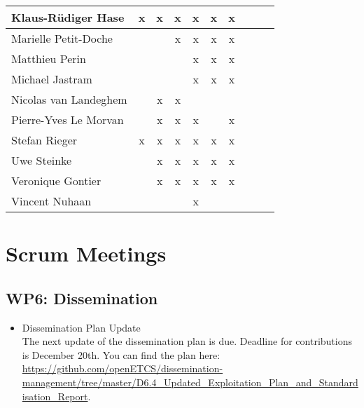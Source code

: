 \documentclass[a4paper, 11pt]{article}
\begin{document}
\begin{tabular}{|l|c|c|c||c|c|c||c|c|c|}
Klaus-R\"udiger Hase & x & x & x & x & x & x \\\hline
Marielle Petit-Doche &   &   & x & x & x & x \\\hline
Matthieu Perin       &   &   &   & x & x & x \\\hline
Michael Jastram      &   &   &   & x & x & x \\\hline
Nicolas van Landeghem&   & x & x &   &   &   \\\hline
Pierre-Yves Le Morvan&   & x & x & x &   & x \\\hline
Stefan Rieger        & x & x & x & x & x & x \\\hline
Uwe Steinke          &   & x & x & x & x & x \\\hline
Veronique Gontier    &   & x & x & x & x & x \\\hline
Vincent Nuhaan       &   &   &   & x &   &   \\\hline
\end{tabular}


\section{Scrum Meetings}

\subsection{WP6: Dissemination}
\begin{itemize}
\item Dissemination Plan Update\\
The next update of the dissemination plan is due. Deadline for contributions is December 20th. You can find the plan here:
\url{https://github.com/openETCS/dissemination-management/tree/master/D6.4_Updated_Exploitation_Plan_and_Standardisation_Report}.

\end{itemize}
\end{document}
